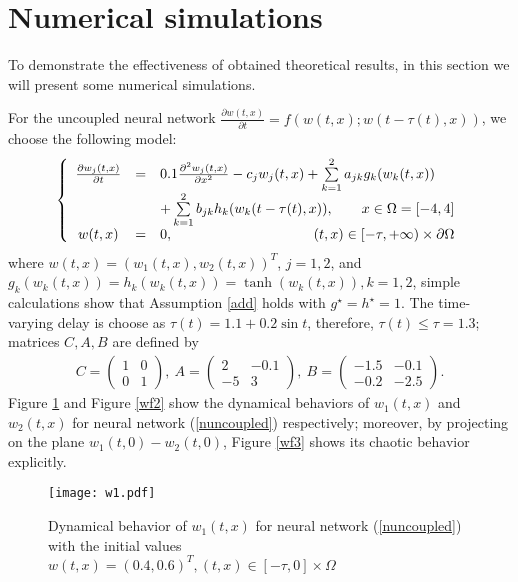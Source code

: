 \documentclass[review]{elsarticle}
\begin{document}
\section{Numerical simulations}\label{nu}
To demonstrate the effectiveness of obtained theoretical results, in this section we will present some numerical simulations.

For the uncoupled neural network $\frac{\partial{w}(t,x)}{\partial{t}}=f(w(t,x);w(t-\tau(t),x))$, we choose the following model:
\begin{align}\label{nuncoupled}
\left\{
\begin{array}{ccl}
\frac{\partial{w}_j(t,x)}{\partial{t}}
&=&0.1\frac{\partial^2{w}_j(t,x)}{\partial{x}^2}
-c_jw_j(t,x)+\sum\limits_{k=1}^2a_{jk}g_k(w_k(t,x))\\
&&+\sum\limits_{k=1}^2b_{jk}h_k(w_k(t-\tau(t),x)), \qquad\hfill{} x\in \Omega=[-4,4] \\
w(t,x)&=&0,\quad\hfill{} (t,x)\in [-\tau,+\infty)\times\partial{\Omega}
\end{array}\right.
\end{align}
where $w(t,x)=(w_1(t,x),w_2(t,x))^T$, $j=1, 2$, and $g_k(w_k(t,x))=h_k(w_k(t,x))=\tanh(w_k(t,x)), k=1,2$, simple calculations show that Assumption \ref{add} holds with $g^{\star}=h^{\star}=1$. The time-varying delay is choose as $\tau(t)=1.1+0.2\sin t$, therefore, $\tau(t)\le \tau=1.3$; matrices $C, A, B$ are defined by
\begin{align*}
C=\left(\begin{array}{cc}1&0\\0&1\end{array}\right),~
A=\left(\begin{array}{cc}2&-0.1\\-5&3\end{array}\right),~
B=\left(\begin{array}{cc}-1.5&-0.1\\-0.2&-2.5\end{array}\right).
\end{align*}
 Figure \ref{wf1} and Figure \ref{wf2} show the dynamical behaviors of $w_1(t,x)$ and $w_2(t,x)$ for neural network (\ref{nuncoupled}) respectively; moreover, by projecting on the plane $w_1(t,0)-w_2(t,0)$, Figure \ref{wf3} shows its chaotic behavior explicitly.

\begin{figure}
\begin{center}
\texttt{[image: w1.pdf]}
\end{center}
\caption{Dynamical behavior of $w_1(t,x)$ for neural network (\ref{nuncoupled}) with the initial values $w(t,x)=(0.4,0.6)^T, (t,x)\in [-\tau,0]\times\Omega$}\label{wf1}
\end{figure}
\end{document}
